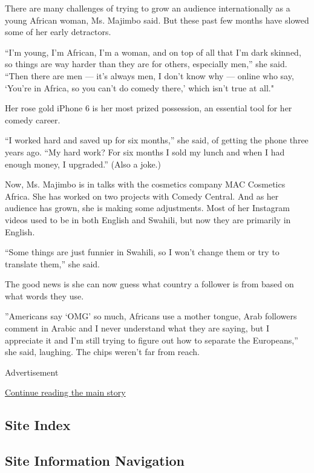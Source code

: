 There are many challenges of trying to grow an audience internationally
as a young African woman, Ms. Majimbo said. But these past few months
have slowed some of her early detractors.

``I'm young, I'm African, I'm a woman, and on top of all that I'm dark
skinned, so things are way harder than they are for others, especially
men,'' she said. ``Then there are men --- it's always men, I don't know
why --- online who say, `You're in Africa, so you can't do comedy
there,' which isn't true at all."

Her rose gold iPhone 6 is her most prized possession, an essential tool
for her comedy career.

``I worked hard and saved up for six months,'' she said, of getting the
phone three years ago. ``My hard work? For six months I sold my lunch
and when I had enough money, I upgraded.'' (Also a joke.)

Now, Ms. Majimbo is in talks with the cosmetics company MAC Cosmetics
Africa. She has worked on two projects with Comedy Central. And as her
audience has grown, she is making some adjustments. Most of her
Instagram videos used to be in both English and Swahili, but now they
are primarily in English.

``Some things are just funnier in Swahili, so I won't change them or try
to translate them,'' she said.

The good news is she can now guess what country a follower is from based
on what words they use.

''Americans say `OMG' so much, Africans use a mother tongue, Arab
followers comment in Arabic and I never understand what they are saying,
but I appreciate it and I'm still trying to figure out how to separate
the Europeans,'' she said, laughing. The chips weren't far from reach.

Advertisement

\protect\hyperlink{after-bottom}{Continue reading the main story}

\hypertarget{site-index}{%
\subsection{Site Index}\label{site-index}}

\hypertarget{site-information-navigation}{%
\subsection{Site Information
Navigation}\label{site-information-navigation}}

